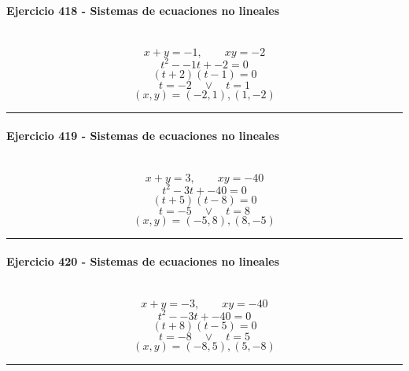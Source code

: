 \documentclass[10pt,a4paper]{article}
\newcommand{\res}[1]{\paragraph{#1}\mbox{}\\[-1.2em]}
\begin{document}
\res{Ejercicio 418 - Sistemas de ecuaciones no lineales}
\[ x+y=-1,\qquad xy=-2 \]
\[ t^2--1t+-2=0 \]
\[ (t+2)(t-1)=0 \]
\[ t=-2\quad \vee \quad t=1 \]
\[ \boxed{(x,y)=(-2,1),(1,-2)} \]
\vspace{1mm}\hrule\vspace{2mm}
\res{Ejercicio 419 - Sistemas de ecuaciones no lineales}
\[ x+y=3,\qquad xy=-40 \]
\[ t^2-3t+-40=0 \]
\[ (t+5)(t-8)=0 \]
\[ t=-5\quad \vee \quad t=8 \]
\[ \boxed{(x,y)=(-5,8),(8,-5)} \]
\vspace{1mm}\hrule\vspace{2mm}
\res{Ejercicio 420 - Sistemas de ecuaciones no lineales}
\[ x+y=-3,\qquad xy=-40 \]
\[ t^2--3t+-40=0 \]
\[ (t+8)(t-5)=0 \]
\[ t=-8\quad \vee \quad t=5 \]
\[ \boxed{(x,y)=(-8,5),(5,-8)} \]
\vspace{1mm}\hrule\vspace{2mm}
\end{document}
